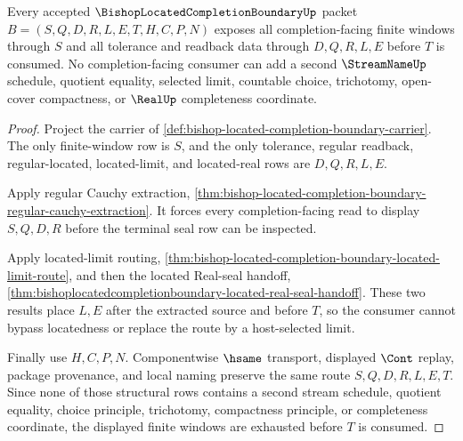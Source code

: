 \begin{theorem}
\label{thm:bishop-located-completion-boundary-window-exhaustion}
Every accepted $\BishopLocatedCompletionBoundaryUp$ packet $B=(S,Q,D,R,L,E,T,H,C,P,N)$ exposes all completion-facing finite windows through $S$ and all tolerance and readback data through $D,Q,R,L,E$ before $T$ is consumed. No completion-facing consumer can add a second $\StreamNameUp$ schedule, quotient equality, selected limit, countable choice, trichotomy, open-cover compactness, or $\RealUp$ completeness coordinate.
\end{theorem}
\begin{proof}
Project the carrier of \autoref{def:bishop-located-completion-boundary-carrier}. The only finite-window row is $S$, and the only tolerance, regular readback, regular-located, located-limit, and located-real rows are $D,Q,R,L,E$.

Apply regular Cauchy extraction, \autoref{thm:bishop-located-completion-boundary-regular-cauchy-extraction}. It forces every completion-facing read to display $S,Q,D,R$ before the terminal seal row can be inspected.

Apply located-limit routing, \autoref{thm:bishop-located-completion-boundary-located-limit-route}, and then the located Real-seal handoff, \autoref{thm:bishoplocatedcompletionboundary-located-real-seal-handoff}. These two results place $L,E$ after the extracted source and before $T$, so the consumer cannot bypass locatedness or replace the route by a host-selected limit.

Finally use $H,C,P,N$. Componentwise $\hsame$ transport, displayed $\Cont$ replay, package provenance, and local naming preserve the same route $S,Q,D,R,L,E,T$. Since none of those structural rows contains a second stream schedule, quotient equality, choice principle, trichotomy, compactness principle, or completeness coordinate, the displayed finite windows are exhausted before $T$ is consumed.
\end{proof}

